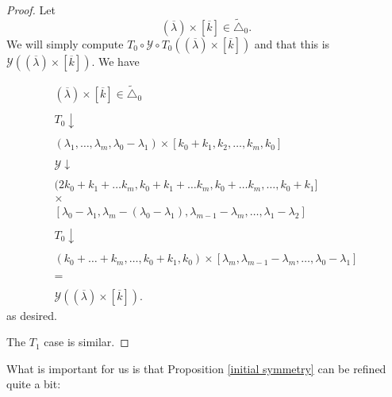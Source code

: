 \documentclass[12pt,oneside,openany]{article}
\begin{document}
\begin{proof}
Let $$(\overline{\lambda} )\times [ \overline{k} ] \in  \tilde{\triangle}_0 .$$
We will simply compute $T_0\circ \mathcal{Y} \circ T_0((\overline{\lambda} )\times [ \overline{k} ] )$ and that this is $\mathcal{Y}((\overline{\lambda} )\times [ \overline{k} ] ).$
We have 

$$\begin{array}{c} 
(\overline{\lambda} )\times [ \overline{k} ] \in  \tilde{\triangle}_0 \\ \\
T_0 \downarrow \\ \\
(\lambda_1, \ldots, \lambda_m, \lambda_0-\lambda_1) \times [ k_0+k_1, k_2, \ldots, k_{m}, k_0] \\ \\
\mathcal{Y} \downarrow \\ \\
(2k_0 + k_1 + \ldots k_m, k_0 + k_1 + \ldots k_m,  k_0 + \ldots k_m, \ldots, k_0+k_1] \\
\times \\
 \left[\lambda_0-\lambda_1, \lambda_m-(\lambda_0-\lambda_1), \lambda_{m-1}-\lambda_m, \ldots, \lambda_1-\lambda_2\right]\\ \\
 T_0\downarrow \\ \\
 (k_0+\ldots + k_m, \ldots, k_0+k_1, k_0) \times [\lambda_m, \lambda_{m-1}-\lambda_m, \ldots, \lambda_0-\lambda_1]\\ \\
 =\\ \\
 \mathcal{Y}((\overline{\lambda} )\times [ \overline{k} ] ).
 \end{array}$$
 as desired.
 
 The $T_1$ case is similar.
\end{proof}





















What is important for us is that Proposition \ref{initial symmetry}
 can be refined quite a bit:
\end{document}
